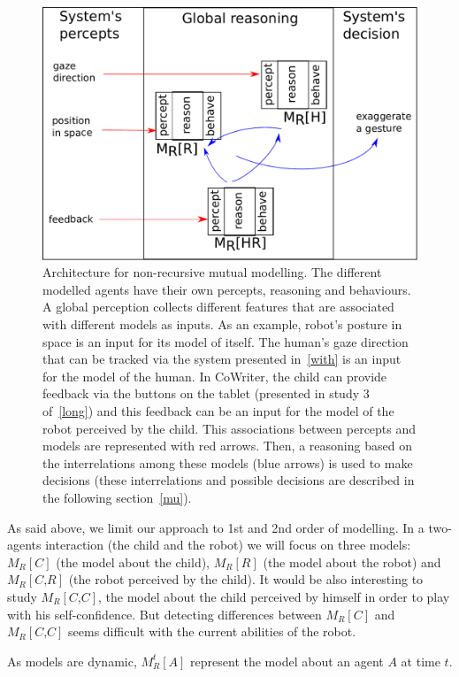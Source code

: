 \documentclass[10pt,a4paper]{article}
\begin{document}
\begin{figure}[!]
\centering
\includegraphics[width=0.6\columnwidth]{archi_general}
\caption{\small Architecture for non-recursive mutual modelling. The different modelled agents have their own percepts, reasoning and behaviours. A global perception collects different features that are associated with different models as inputs. As an example, robot's posture in space is an input for its model of itself. The human's gaze direction that can be tracked via the system presented in~\ref{with} is an input for the model of the human. In CoWriter, the child can provide feedback via the buttons on the tablet (presented in study 3 of~\ref{long}) and this feedback can be an input for the model of the robot perceived by the child. This associations  between percepts and models are represented with red arrows. Then, a reasoning based on the interrelations among these models (blue arrows) is used to make decisions (these interrelations and possible decisions are described in the following section~\ref{mu}).}
\label{archi_gal}
\end{figure} 

As said above, we limit our approach to 1st and 2nd order of modelling. In a two-agents interaction (the child and the robot) we will focus on three models: $ M_R\left[\textit{C}\right]$ (the model about the child), $ M_R\left[\textit{R}\right]$ (the model about the robot) and $ M_R\left[\textit{C,R}\right]$ (the robot perceived by the child). 
It would be also interesting to study $ M_R\left[\textit{C,C}\right]$, the model about the child perceived by himself in order to play with his self-confidence. But detecting differences between $ M_R\left[\textit{C}\right]$ and $ M_R\left[\textit{C,C}\right]$ seems difficult with the current abilities of the robot. 

As models are dynamic, $ M^t_R\left[\textit{A}\right]$ represent the model about an agent $A$ at time $t$.
\end{document}
